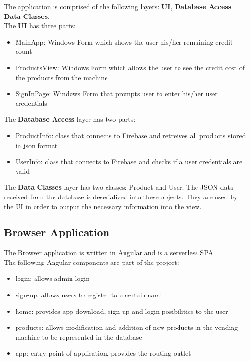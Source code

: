 \documentclass[a4paper,11pt]{article}
\begin{document}
The application is comprised of the following layers: {\bf UI}, {\bf Database Access}, {\bf Data Classes}.\\

The {\bf UI} has three parts:
\begin{itemize}
\item MainApp: Windows Form which shows the user his/her remaining credit count
\item ProductsView: Windows Form which allows the user to see the credit cost of the products from the machine
\item SignInPage: Windows Form that prompts user to enter his/her user credentials\\
\end{itemize}

The {\bf Database Access} layer has two parts:
\begin{itemize}
\item ProductInfo: class that connects to Firebase and retreives all products stored in json format
\item UserInfo: class that connects to Firebase and checks if a user credentials are valid\\
\end{itemize}

The {\bf Data Classes} layer has two classes: Product and User. The JSON data received from the database
is deserialized into these objects. They are used by the UI in order to output the necessary information into the view.\\ 

\subsection{Browser Application}
The Browser application is written in Angular and is a serverless SPA.\\
The following Angular components are part of the project: 
\begin{itemize}
\item login: allows admin login
\item sign-up: allows users to register to a certain card 
\item home: provides app download, sign-up and login posibilities to the user 
\item products: allows modification and addition of new products in the vending machine to be represented in the database
\item app: entry point of application, provides the routing outlet\\
\end{itemize}
\end{document}
